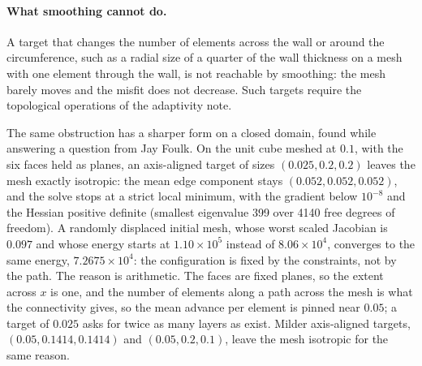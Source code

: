 \documentclass[11pt]{article}
\begin{document}
\paragraph{What smoothing cannot do.} A target that changes the number
of elements across the wall or around the circumference, such as a
radial size of a quarter of the wall thickness on a mesh with one element
through the wall, is not reachable by smoothing: the mesh barely moves and
the misfit does not decrease. Such targets require the topological
operations of the adaptivity note.

The same obstruction has a sharper form on a closed domain, found while
answering a question from Jay Foulk. On the unit cube meshed at $0.1$, with
the six faces held as planes, an axis-aligned target of sizes
$(0.025, 0.2, 0.2)$ leaves the mesh exactly isotropic: the mean edge
component stays $(0.052, 0.052, 0.052)$, and the solve stops at a strict
local minimum, with the gradient below $10^{-8}$ and the Hessian positive
definite (smallest eigenvalue 399 over 4140 free degrees of freedom). A
randomly displaced initial mesh, whose worst scaled Jacobian is $0.097$
and whose energy starts at $1.10 \times 10^5$ instead of
$8.06 \times 10^4$, converges to the same energy, $7.2675 \times 10^4$:
the configuration is fixed by the constraints, not by the path. The reason
is arithmetic. The faces are fixed planes, so the extent across $x$ is
one, and the number of elements along a path across the mesh is what the
connectivity gives, so the mean advance per element is pinned near $0.05$;
a target of $0.025$ asks for twice as many layers as exist. Milder
axis-aligned targets, $(0.05, 0.1414, 0.1414)$ and $(0.05, 0.2, 0.1)$,
leave the mesh isotropic for the same reason.
\end{document}
